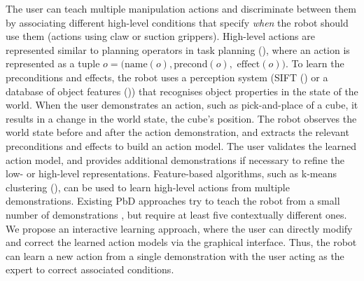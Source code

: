 The user can teach multiple manipulation actions and discriminate between them by associating different high-level conditions that specify \textit{when} the robot should use them (\eg actions using claw or suction grippers).
High-level actions are represented similar to planning operators in task planning (), where an action is represented as a tuple $o = (\text{name}(o), \text{precond}(o),$ $\text{effect}(o))$.
To learn the preconditions and effects, the robot uses a perception system (\eg SIFT (\cite{ahmadzadeh2015learning}) or a database of object features (\cite{mason2011robot})) that recognises object properties in the state of the world.
When the user demonstrates an action, such as pick-and-place of a cube, %
it results in a change in the world state, \eg the cube's position.
The robot observes the world state before and after the action demonstration, and extracts the relevant preconditions and effects to build an action model. %
The user validates the learned action model, and provides additional demonstrations if necessary to refine the low- or high-level representations.
Feature-based algorithms, such as k-means clustering (\cite{mollard2015robot,abdo2013learning}), can be used to learn high-level actions from multiple demonstrations.
Existing PbD approaches try to teach the robot from a small number of demonstrations \cite{orendt2016robot,abdo2013learning}, but require at least five contextually different ones.
We propose an interactive learning approach, where the user can directly modify and correct the learned action models via the graphical interface.
Thus, the robot can learn a new action from a single demonstration with the user acting as the expert to correct associated conditions.



